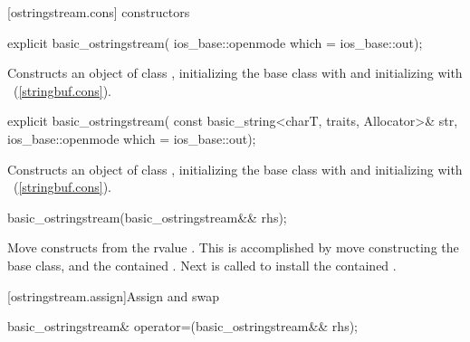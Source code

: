 [ostringstream.cons]{ constructors}

%
\begin{itemdecl}
explicit basic_ostringstream(
  ios_base::openmode which = ios_base::out);
\end{itemdecl}

\begin{itemdescr}
\pnum
\effects
Constructs an object of class
,
initializing the base class with
and initializing  with
~(\ref{stringbuf.cons}).
\end{itemdescr}

%
\begin{itemdecl}
explicit basic_ostringstream(
  const basic_string<charT, traits, Allocator>& str,
  ios_base::openmode which = ios_base::out);
\end{itemdecl}

\begin{itemdescr}
\pnum
\effects
Constructs an object of class
,
initializing the base class with
and initializing  with
~(\ref{stringbuf.cons}).
\end{itemdescr}

%
\begin{itemdecl}
basic_ostringstream(basic_ostringstream&& rhs);
\end{itemdecl}

\begin{itemdescr}
\pnum
\effects Move constructs from the rvalue . This
is accomplished by move constructing the base class, and the contained
.
Next  is called to
install the contained .
\end{itemdescr}

[ostringstream.assign]{Assign and swap}

%
\begin{itemdecl}
basic_ostringstream& operator=(basic_ostringstream&& rhs);
\end{itemdecl}


